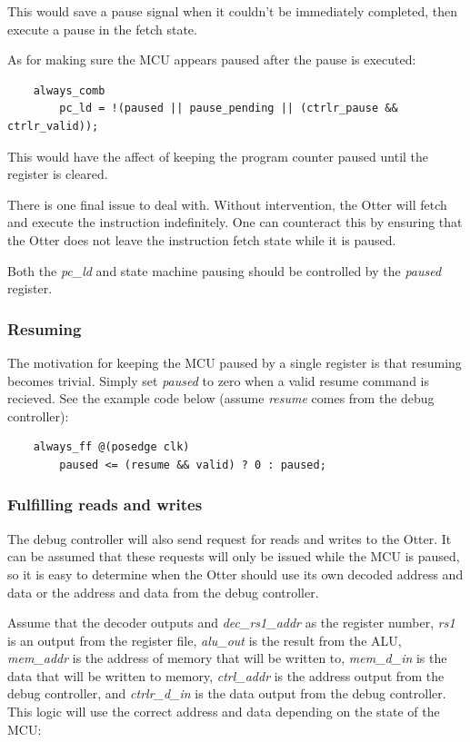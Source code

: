\documentclass[10pt,a4paper]{article}
\begin{document}
This would save a pause signal when it couldn't be immediately completed, then execute a
pause in the fetch state.

As for making sure the MCU appears paused after the pause is executed:

\begin{verbatim}
    always_comb
        pc_ld = !(paused || pause_pending || (ctrlr_pause && ctrlr_valid));
\end{verbatim}

This would have the affect of keeping the program counter paused until the register is cleared.

There is one final issue to deal with. Without intervention, the Otter will fetch and execute the
instruction indefinitely. One can counteract this by ensuring that the Otter does not leave the
instruction fetch state while it is paused.

Both the \emph{pc\_ld} and state machine pausing should be controlled by the \emph{paused} register.

\subsubsection{Resuming}
The motivation for keeping the MCU paused by a single register is that resuming becomes trivial.
Simply set \emph{paused} to zero when a valid resume command is recieved. See the example code
below (assume \emph{resume} comes from the debug controller):

\begin{verbatim}
    always_ff @(posedge clk)
        paused <= (resume && valid) ? 0 : paused;
\end{verbatim}

\subsubsection{Fulfilling reads and writes}
The debug controller will also send request for reads and writes to the Otter. It can be assumed
that these requests will only be issued while the MCU is paused, so it is easy to determine when the
Otter should use its own decoded address and data or the address and data from the debug controller.

Assume that the decoder outputs and \emph{dec\_rs1\_addr} as the register number, \emph{rs1} is an
output from the register file, \emph{alu\_out} is the result from the ALU,
\emph{mem\_addr} is the address of memory that will be written to, \emph{mem\_d\_in} is
the data that will be written to memory, \emph{ctrl\_addr} is the address output from the
debug controller, and \emph{ctrlr\_d\_in} is the data output from the debug controller. This logic
will use the correct address and data depending on the state of the MCU:
\end{document}
